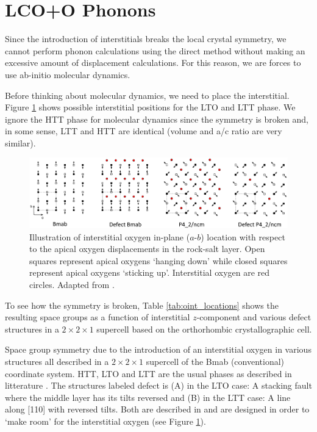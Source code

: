 \clearpage

\section{LCO+O Phonons}
Since the introduction of interstitials breaks the local crystal symmetry, we cannot perform phonon calculations using the direct method without making an excessive amount of displacement calculations. For this reason, we are forces to use ab-initio molecular dynamics.

Before thinking about molecular dynamics, we need to place the interstitial. Figure \ref{fig:oint_location} shows possible interstitial positions for the LTO and LTT phase. We ignore the HTT phase for molecular dynamics since the symmetry is broken and, in some sense, LTT and HTT are identical (volume and a/c ratio are very similar).



\begin{figure}
    \centering
    \includegraphics[width=\textwidth]{fig/simulation/oint.png}
    \caption[Illustration of interstitial positions]{Illustration of interstitial oxygen in-plane ($a$-$b$) location with respect to the apical oxygen displacements in the rock-salt layer. Open squares represent apical oxygens `hanging down' while closed squares represent apical oxygens `sticking up'. Interstitial oxygen are red circles. Adapted from \cite{Tranquada1995}.}
    \label{fig:oint_location}
\end{figure}

To see how the symmetry is broken, Table \ref{tab:oint_locations} shows the resulting space groups as a function of interstitial $z$-component and various defect structures in a $2 \times 2 \times 1$ supercell based on the orthorhombic crystallographic cell. 

\begin{table}[b]
    \centering
    
    \caption[Oxygen interstitial phases]{Space group symmetry due to the introduction of an interstitial oxygen in various structures all described in a $2 \times 2 \times 1$ supercell of the Bmab (conventional) coordinate system. HTT, LTO and LTT are the usual phases as described in litterature \cite{Hucker2012}. The structures labeled defect is (A) in the LTO case: A stacking fault where the middle layer has its tilts reversed and (B) in the LTT case: A line along [110] with reversed tilts. Both are described in \cite{Tranquada1994} and are designed in order to `make room' for the interstitial oxygen (see Figure \ref{fig:oint_location}).}
    \label{tab:oint_locations}
\end{table}

